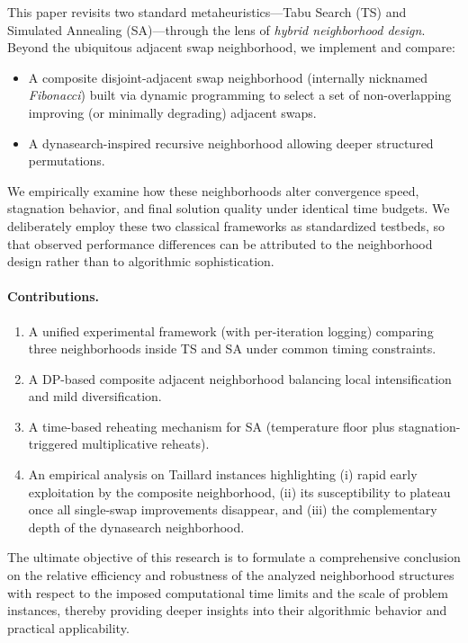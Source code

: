 \documentclass[runningheads]{llncs}
\begin{document}
This paper revisits two standard metaheuristics---Tabu Search (TS) and Simulated Annealing (SA)---through the lens of \emph{hybrid neighborhood design}. Beyond the ubiquitous adjacent swap neighborhood, we implement and compare:
\begin{itemize}
  \item A composite disjoint-adjacent swap neighborhood (internally nicknamed \emph{Fibonacci}) built via dynamic programming to select a set of non-overlapping improving (or minimally degrading) adjacent swaps.
  \item A dynasearch-inspired recursive neighborhood allowing deeper structured permutations.
\end{itemize}
We empirically examine how these neighborhoods alter convergence speed, stagnation behavior, and final solution quality under identical time budgets.
We deliberately employ these two classical frameworks as standardized testbeds, so that observed performance differences can be attributed to the neighborhood design rather than to algorithmic sophistication.

\paragraph{Contributions.}
\begin{enumerate}
  \item A unified experimental framework (with per-iteration logging) comparing three neighborhoods inside TS and SA under common timing constraints.
  \item A DP-based composite adjacent neighborhood balancing local intensification and mild diversification.
  \item A time-based reheating mechanism for SA (temperature floor plus stagnation-triggered multiplicative reheats).
  \item An empirical analysis on Taillard instances highlighting (i) rapid early exploitation by the composite neighborhood, (ii) its susceptibility to plateau once all single-swap improvements disappear, and (iii) the complementary depth of the dynasearch neighborhood.
\end{enumerate}
The ultimate objective of this research is to formulate a comprehensive conclusion on the relative efficiency and robustness of the analyzed neighborhood structures with respect to the imposed computational time limits and the scale of problem instances, thereby providing deeper insights into their algorithmic behavior and practical applicability.
\end{document}
